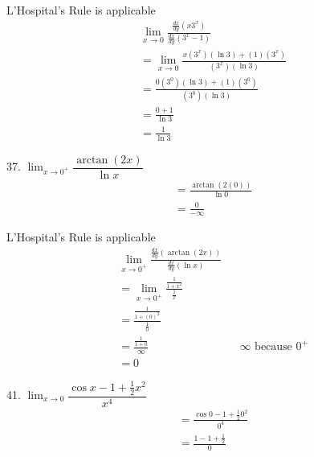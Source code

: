 \documentclass{article}
\begin{document}
\begin{description}
\begin{description}
                L'Hospital's Rule is applicable
                \begin{align*}
                   & \lim_{x\to0}\frac{\frac{dx}{dy}(x3^x)}{\frac{dx}{dy}(3^x-1)}  \\[1em]
                   & = \lim_{x\to0}\frac{x(3^x)(\ln{3}) + (1)(3^x)}{(3^x)(\ln{3})} \\[1em]
                   & = \frac{0(3^0)(\ln{3}) + (1)(3^0)}{(3^0)(\ln{3})}             \\[1em]
                   & =  \frac{0 + 1}{\ln{3}}                                       \\[1em]
                   & =  \boxed{\frac{1}{\ln{3}}}
                \end{align*}
          \item 37. $\lim_{x\to0^{+}} \dfrac{\arctan({2x})}{\ln{x}}$
                \begin{align*}
                   & = \frac{\arctan({2(0)})}{\ln{0}} \\[1em]
                   & = \frac{0}{-\infty}
                \end{align*}

                L'Hospital's Rule is applicable
                \begin{align*}
                   & \lim_{x\to0^{+}}\frac{\frac{dx}{dy}(\arctan({2x}))}{\frac{dx}{dy}(\ln{x})}                                   \\[1em]
                   & = \lim_{x\to0^{+}}\frac{\frac{1}{1 + x^2}}{\frac{1}{x}}                                                      \\[1em]
                   & = \frac{\frac{1}{1 + (0)^2}}{\frac{1}{0}}                                                                    \\[1em]
                   & = \frac{\frac{1}{1 + 0}}{\infty}                                           &  & \infty\text{ because } 0^{+} \\[1em]
                   & =\boxed{0}
                \end{align*}
          \item 41. $\lim_{x\to0} \dfrac{\cos{x} - 1 + \frac{1}{2}x^2}{x^4}$
                \begin{align*}
                   & = \frac{\cos{0} - 1 + \frac{1}{2}0^2}{0^4} \\[1em]
                   & = \frac{1 - 1 + \frac{1}{2}}{0}            \\[1em]
                \end{align*}


\end{description}
\end{description}
\end{document}
